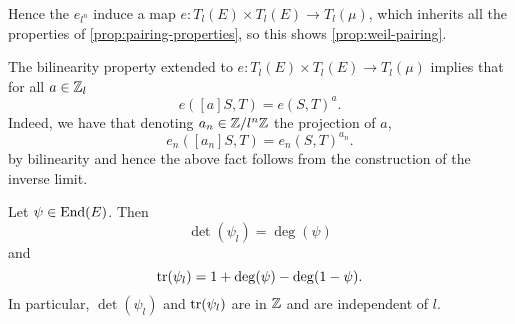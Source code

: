 Hence the $e_{l^n}$ induce a map $e:T_l(E)\times T_l(E) \to T_l(\mu)$,
which inherits all the properties of \ref{prop:pairing-properties},
so this shows \ref{prop:weil-pairing}.

\begin{remark}
	The bilinearity property extended to $e:T_l(E)\times T_l(E) \to T_l(\mu)$
	implies that for all $a \in \mathbb{Z}_l$
	\begin{equation*}
		e([a]S, T) = e(S, T)^a.
	\end{equation*}
	Indeed, we have that denoting $a_n \in \mathbb{Z}/l^n\mathbb{Z}$ the projection of $a$,
	\begin{equation*}
		e_n([a_n]S, T) = e_n(S, T)^{a_n}.
	\end{equation*}
	by bilinearity and hence the above fact follows from the construction
	of the inverse limit.
\end{remark}


\begin{proposition}
	\label{prop:deg-tr-det}
	Let $\psi \in \operatorname{End}(E)$. Then
	\begin{equation*}
		\det(\psi_l) = \deg(\psi)
	\end{equation*}
	and
	\begin{equation*}
		\operatorname{tr}(\psi_l) = 1 + \deg(\psi) - \deg(1 - \psi).
	\end{equation*}
	In particular, $\det(\psi_l)$ and $\operatorname{tr}(\psi_l)$ are in $\mathbb{Z}$
	and are independent of $l$.
\end{proposition}

